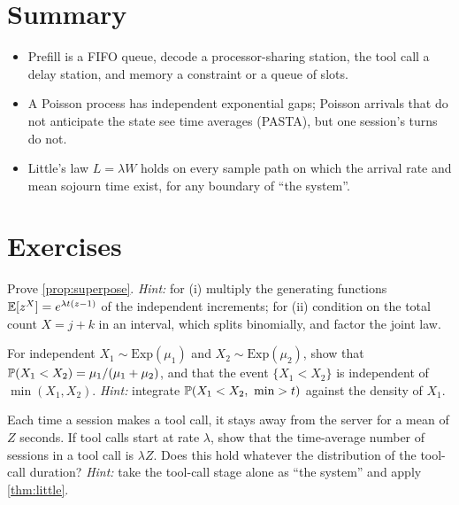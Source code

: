 \section{Summary}
\begin{itemize}
\item Prefill is a FIFO queue, decode a processor-sharing station, the tool call a delay station, and memory a constraint or a queue of slots.
\item A Poisson process has independent exponential gaps; Poisson arrivals that do not anticipate the state see time averages (PASTA), but one session's turns do not.
\item Little's law $L=\lambda W$ holds on every sample path on which the arrival rate and mean sojourn time exist, for any boundary of ``the system''.
\end{itemize}

\section{Exercises}

\begin{exercise}\label{L1:exr:superpose}
Prove \cref{prop:superpose}.
\emph{Hint:} for (i) multiply the generating functions $\mathbb{E}[z^X]=e^{\lambda t(z-1)}$ of
the independent increments; for (ii) condition on the total count $X=j+k$ in an
interval, which splits binomially, and factor the joint law.
\end{exercise}

\begin{exercise}\label{L1:exr:race}
For independent $X_1\sim\mathrm{Exp}(\mu_1)$ and $X_2\sim\mathrm{Exp}(\mu_2)$, show that
$\mathbb{P}(X_1<X_2)=\mu_1/(\mu_1+\mu_2)$, and that the event $\{X_1<X_2\}$ is independent
of $\min(X_1,X_2)$.
\emph{Hint:} integrate $\Prob(X_1<X_2,\ \min>t)$ against the density of $X_1$.
\end{exercise}

\begin{exercise}\label{L1:exr:delay}
Each time a session makes a tool call, it stays away from the server for a mean of $Z$
seconds. If tool calls start at rate $\lambda$, show that the time-average number of
sessions in a tool call is $\lambda Z$. Does this hold whatever the distribution of the
tool-call duration?
\emph{Hint:} take the tool-call stage alone as ``the system'' and apply
\cref{thm:little}.
\end{exercise}


